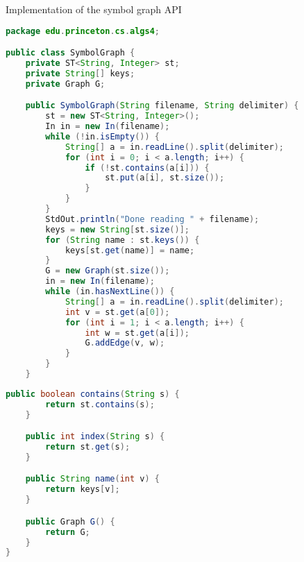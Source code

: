 \documentclass[8pt,a4paper,compress]{beamer}
\begin{document}
\begin{frame}[fragile]
\pause

Implementation of the symbol graph API
\begin{lstlisting}[language=Java]
package edu.princeton.cs.algs4;

public class SymbolGraph {
    private ST<String, Integer> st;
    private String[] keys;
    private Graph G;

    public SymbolGraph(String filename, String delimiter) {
        st = new ST<String, Integer>();
        In in = new In(filename);
        while (!in.isEmpty()) {
            String[] a = in.readLine().split(delimiter);
            for (int i = 0; i < a.length; i++) {
                if (!st.contains(a[i])) {
                    st.put(a[i], st.size());
                }
            }
        }
        StdOut.println("Done reading " + filename);
        keys = new String[st.size()];
        for (String name : st.keys()) {
            keys[st.get(name)] = name;
        }
        G = new Graph(st.size());
        in = new In(filename);
        while (in.hasNextLine()) {
            String[] a = in.readLine().split(delimiter);
            int v = st.get(a[0]);
            for (int i = 1; i < a.length; i++) {
                int w = st.get(a[i]);
                G.addEdge(v, w);
            }
        }
    }
\end{lstlisting}
\end{frame}

\begin{frame}[fragile]
\pause

\begin{lstlisting}[language=Java]
    public boolean contains(String s) { 
        return st.contains(s); 
    }

    public int index(String s) { 
        return st.get(s); 
    }

    public String name(int v) { 
        return keys[v]; 
    }

    public Graph G() { 
        return G; 
    }
}
\end{lstlisting}
\end{frame}
\end{document}
